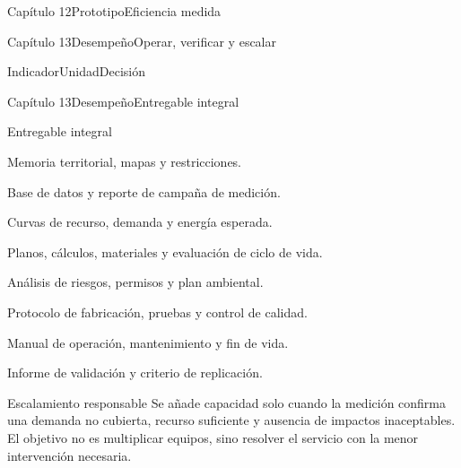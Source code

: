 \documentclass{../plantilla/hvtbook}
\begin{document}
\begin{HVTPage}{Capítulo 12}{Prototipo}{Eficiencia medida}
\end{HVTPage}

\begin{HVTPage}{Capítulo 13}{Desempeño}{Operar, verificar y escalar}
\begin{HVTTable}{Indicador}{Unidad}{Decisión}
\end{HVTTable}
\end{HVTPage}

\begin{HVTPage}{Capítulo 13}{Desempeño}{Entregable integral}
\begin{HVTTask}{Entregable integral}
  \item Memoria territorial, mapas y restricciones.
  \item Base de datos y reporte de campaña de medición.
  \item Curvas de recurso, demanda y energía esperada.
  \item Planos, cálculos, materiales y evaluación de ciclo de vida.
  \item Análisis de riesgos, permisos y plan ambiental.
  \item Protocolo de fabricación, pruebas y control de calidad.
  \item Manual de operación, mantenimiento y fin de vida.
  \item Informe de validación y criterio de replicación.
\end{HVTTask}
\begin{HVTWarning}{Escalamiento responsable}
Se añade capacidad solo cuando la medición confirma una demanda no cubierta, recurso suficiente y ausencia de impactos inaceptables. El objetivo no es multiplicar equipos, sino resolver el servicio con la menor intervención necesaria.
\end{HVTWarning}
\end{HVTPage}
\end{document}
